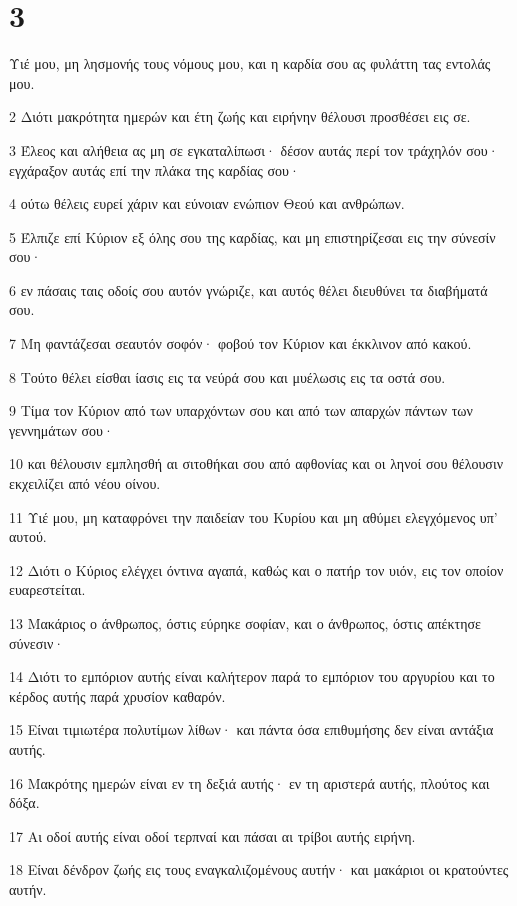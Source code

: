 \chapter{3}

\par Υιέ μου, μη λησμονής τους νόμους μου, και η καρδία σου ας φυλάττη τας εντολάς μου.
\par 2 Διότι μακρότητα ημερών και έτη ζωής και ειρήνην θέλουσι προσθέσει εις σε.
\par 3 Έλεος και αλήθεια ας μη σε εγκαταλίπωσι· δέσον αυτάς περί τον τράχηλόν σου· εγχάραξον αυτάς επί την πλάκα της καρδίας σου·
\par 4 ούτω θέλεις ευρεί χάριν και εύνοιαν ενώπιον Θεού και ανθρώπων.
\par 5 Έλπιζε επί Κύριον εξ όλης σου της καρδίας, και μη επιστηρίζεσαι εις την σύνεσίν σου·
\par 6 εν πάσαις ταις οδοίς σου αυτόν γνώριζε, και αυτός θέλει διευθύνει τα διαβήματά σου.
\par 7 Μη φαντάζεσαι σεαυτόν σοφόν· φοβού τον Κύριον και έκκλινον από κακού.
\par 8 Τούτο θέλει είσθαι ίασις εις τα νεύρά σου και μυέλωσις εις τα οστά σου.
\par 9 Τίμα τον Κύριον από των υπαρχόντων σου και από των απαρχών πάντων των γεννημάτων σου·
\par 10 και θέλουσιν εμπλησθή αι σιτοθήκαι σου από αφθονίας και οι ληνοί σου θέλουσιν εκχειλίζει από νέου οίνου.
\par 11 Υιέ μου, μη καταφρόνει την παιδείαν του Κυρίου και μη αθύμει ελεγχόμενος υπ' αυτού.
\par 12 Διότι ο Κύριος ελέγχει όντινα αγαπά, καθώς και ο πατήρ τον υιόν, εις τον οποίον ευαρεστείται.
\par 13 Μακάριος ο άνθρωπος, όστις εύρηκε σοφίαν, και ο άνθρωπος, όστις απέκτησε σύνεσιν·
\par 14 Διότι το εμπόριον αυτής είναι καλήτερον παρά το εμπόριον του αργυρίου και το κέρδος αυτής παρά χρυσίον καθαρόν.
\par 15 Είναι τιμιωτέρα πολυτίμων λίθων· και πάντα όσα επιθυμήσης δεν είναι αντάξια αυτής.
\par 16 Μακρότης ημερών είναι εν τη δεξιά αυτής· εν τη αριστερά αυτής, πλούτος και δόξα.
\par 17 Αι οδοί αυτής είναι οδοί τερπναί και πάσαι αι τρίβοι αυτής ειρήνη.
\par 18 Είναι δένδρον ζωής εις τους εναγκαλιζομένους αυτήν· και μακάριοι οι κρατούντες αυτήν.
